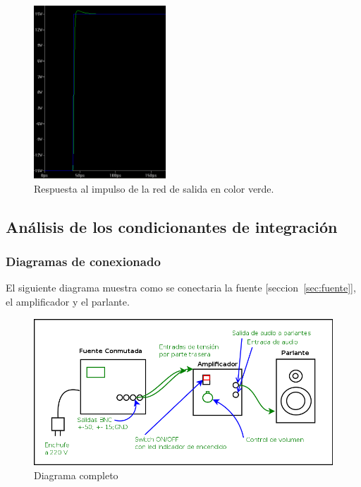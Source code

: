 \documentclass[a4paper,12pt,twoside]{article}
\begin{document}
\begin{figure}[H]
\centering
\includegraphics[width=0.44\textwidth]{img/respuesta_zobel}
\caption{Respuesta al impulso de la red de salida en color verde.}
\label{fig:sim_rta_impulso_zobel} 
\end{figure}
 

\subsection{Análisis de los condicionantes de integración}

\subsubsection{Diagramas de conexionado}
El siguiente diagrama muestra como se conectaria la fuente [seccion~\ref{sec:fuente}], el amplificador y el parlante.

\begin{figure}[H]
\centering
\includegraphics[width=1\textwidth]{img/integracion/diagrama_completo}
\caption{Diagrama completo}
\label{fig:diag_completo} 
\end{figure}
\end{document}
